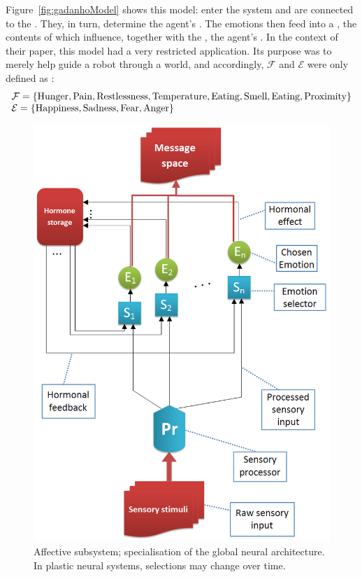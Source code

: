 Figure~\ref{fig:gadanhoModel} shows this model:  enter the system and are connected to the . They, in turn, determine the agent's . The emotions then feed into a , the contents of which influence, together with the , the agent's . In the context of their paper, this model had a very restricted application. Its purpose was to merely help guide a robot through a world, and accordingly, $\mathcal{F}$ and $\mathcal{E}$ were only defined as \cite[p. 47]{DBLP:journals/adb/GadanhoH01}:
$$
	\begin{array}{l}
		\mathcal{F} = \{ \textnormal{Hunger}, \textnormal{Pain}, \textnormal{Restlessness},
						 \textnormal{Temperature}, \textnormal{Eating}, \textnormal{Smell},
						 \textnormal{Eating}, \textnormal{Proximity} \}\\
		\mathcal{E} = \{ \textnormal{Happiness}, \textnormal{Sadness}, \textnormal{Fear},
						 \textnormal{Anger} \}
	\end{array}
$$

\begin{figure}[!h]
	\centering
	\includegraphics[width=400pt]{figs/affectiveSubsystem.png}
	\caption{Affective subsystem; specialisation of the global neural architecture. In plastic neural systems, selections may change over time.}
	\label{fig:affectiveSubsystem}
\end{figure}

